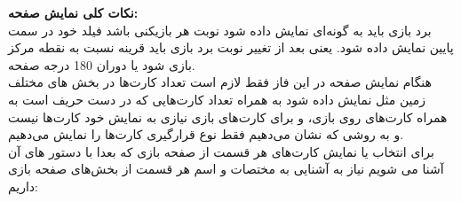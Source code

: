 \documentclass[]{article}
\begin{document}
\vspace{.5cm}
\textbf{نکات کلی نمایش صفحه:}
\\
برد بازی باید به گونه‌ای نمایش داده شود نوبت هر بازیکنی باشد فیلد خود در سمت 
پایین نمایش داده شود. یعنی بعد از تغییر نوبت برد بازی باید قرینه نسبت به 
نقطه مرکز بازی شود یا دوران 180 درجه صفحه.
\\
هنگام نمایش صفحه در این فاز فقط لازم است تعداد کارت‌ها در بخش های مختلف زمین 
مثل  نمایش داده شود به همراه تعداد کارت‌هایی که در دست حریف 
است 
به همراه کارت‌های روی  بازی، و برای کارت‌های  بازی نیازی 
به نمایش خود کارت‌ها نیست و به روشی که نشان می‌دهیم فقط نوع قرارگیری کارت‌ها 
را نمایش می‌دهیم.
\\
برای انتخاب یا نمایش کارت‌های هر قسمت از صفحه بازی که بعدا با دستور های آن 
آشنا می شویم نیاز به آشنایی به مختصات و اسم هر قسمت از بخش‌های صفحه بازی 
داریم:
\end{document}
